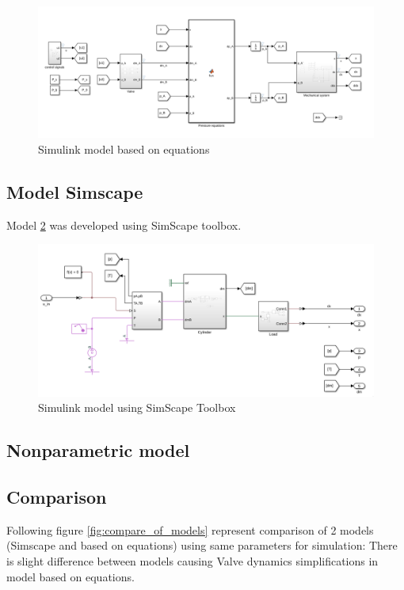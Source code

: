 \documentclass[class=article, crop=false]{standalone}
\begin{document}
\begin{figure}[h!]
    \centering
    \includegraphics[width=1\textwidth]{equations.png}
    \caption{Simulink model based on equations}
    \label{fig:model_equations}
\end{figure}


\subsection{Model Simscape}
Model \ref{fig:model_simscape} was developed using SimScape toolbox.

\begin{figure}[h!]
    \centering
    \includegraphics[width=1\textwidth]{simscape.png}
    \caption{Simulink model using SimScape Toolbox}
    \label{fig:model_simscape}
\end{figure}

\subsection{Nonparametric model}



\subsection{Comparison}
Following figure \ref{fig:compare_of_models} represent comparison of 2 models
(Simscape and based on equations) using same parameters for simulation:
There is slight difference between models causing Valve dynamics
simplifications in model based on equations.
\end{document}
